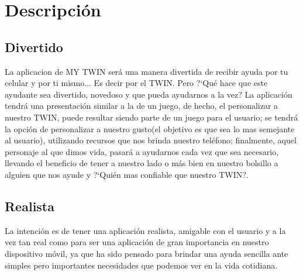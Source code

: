 \documentclass[12pt]{article}
\begin{document}
\newpage
\section{Descripci\'on}

\subsection{Divertido}
La aplicacion de MY TWIN ser\'a una manera divertida de recibir ayuda por tu celular y por ti mismo... Es decir por el TWIN.
Pero ?`Qu\'e hace que este ayudante sea divertido, novedoso y que pueda ayudarnos a la vez?
La aplicaci\'on tendr\'a una presentaci\'on similar a la de un juego, de hecho, el personalizar a nuestro TWIN, puede resultar siendo parte de un juego para el usuario; se tendr\'a la opci\'on de personalizar a nuestro gusto(el objetivo es que sea lo mas semejante al usuario), utilizando recursos que nos brinda nuestro tel\'efono; finalmente, aquel personaje al que dimos vida, pasar\'a a ayudarnos cada vez que sea necesario, llevando el beneficio de tener a nuestro lado o m\'as bien en nuestro bolsillo a alguien que nos ayude y ?`Qui\'en mas confiable que nuestro TWIN?.

\subsection{Realista}
La intenci\'on es de tener una aplicaci\'on realista, amigable con el usuario y a la vez tan real como para ser una aplicaci\'on de gran importancia en nuestro dispositivo m\'ovil, ya que ha sido pensado para brindar una ayuda sencilla ante simples pero importantes necesidades que podemos ver en la vida cotidiana.
\end{document}
